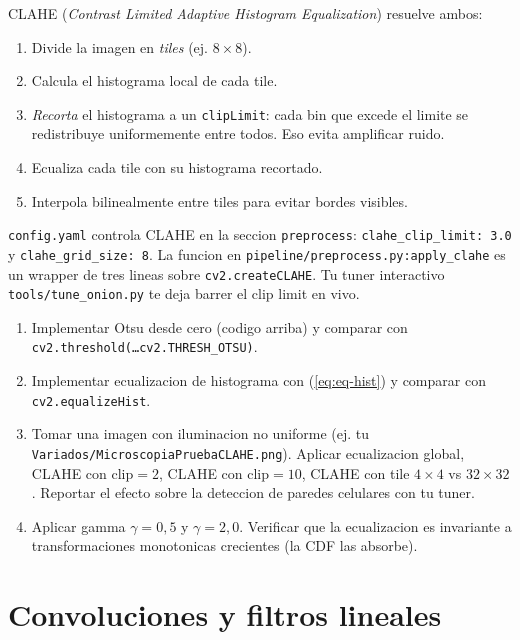 \documentclass[11pt,a4paper,twoside,openright]{book}
\begin{document}
CLAHE (\emph{Contrast Limited Adaptive Histogram Equalization}) resuelve ambos:

\begin{enumerate}[leftmargin=2em]
  \item Divide la imagen en \emph{tiles} (ej. $8\times 8$).
  \item Calcula el histograma local de cada tile.
  \item \emph{Recorta} el histograma a un \texttt{clipLimit}: cada bin que excede el limite se redistribuye uniformemente entre todos. Eso evita amplificar ruido.
  \item Ecualiza cada tile con su histograma recortado.
  \item Interpola bilinealmente entre tiles para evitar bordes visibles.
\end{enumerate}

\begin{pipeline}
\texttt{config.yaml} controla CLAHE en la seccion \texttt{preprocess}: \texttt{clahe\_clip\_limit: 3.0} y \texttt{clahe\_grid\_size: 8}. La funcion en \texttt{pipeline/preprocess.py:apply\_clahe} es un wrapper de tres lineas sobre \texttt{cv2.createCLAHE}. Tu tuner interactivo \texttt{tools/tune\_onion.py} te deja barrer el clip limit en vivo.
\end{pipeline}

\begin{ejercicio}
\begin{enumerate}[leftmargin=2em]
  \item Implementar Otsu desde cero (codigo arriba) y comparar con \texttt{cv2.threshold(\dots cv2.THRESH\_OTSU)}.
  \item Implementar ecualizacion de histograma con (\ref{eq:eq-hist}) y comparar con \texttt{cv2.equalizeHist}.
  \item Tomar una imagen con iluminacion no uniforme (ej. tu \texttt{Variados/MicroscopiaPruebaCLAHE.png}). Aplicar ecualizacion global, CLAHE con $\text{clip}=2$, CLAHE con $\text{clip}=10$, CLAHE con tile $4{\times}4$ vs $32{\times}32$. Reportar el efecto sobre la deteccion de paredes celulares con tu tuner.
  \item Aplicar gamma $\gamma = 0{,}5$ y $\gamma = 2{,}0$. Verificar que la ecualizacion es invariante a transformaciones monotonicas crecientes (la CDF las absorbe).
\end{enumerate}
\end{ejercicio}

\chapter{Convoluciones y filtros lineales}
\label{ch:convolucion}
\end{document}
